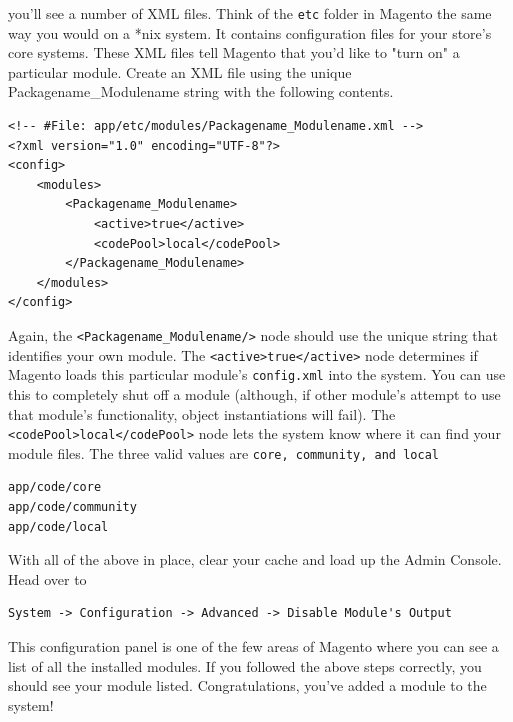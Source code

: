 \documentclass[oneside]{book}
\begin{document}
you'll see a number of XML files.  Think of the \footnotesize\texttt{etc} \normalsize  folder in Magento the same way you would on a *nix system.  It contains configuration files for your store's core systems.  These XML files tell Magento that you'd like to "turn on" a particular module.  Create an XML file using the unique Packagename\_Modulename string with the following contents.

\begin{lstlisting}
<!-- #File: app/etc/modules/Packagename_Modulename.xml -->
<?xml version="1.0" encoding="UTF-8"?>
<config>
    <modules>
        <Packagename_Modulename>
            <active>true</active>
            <codePool>local</codePool>
        </Packagename_Modulename>
    </modules>
</config>

\end{lstlisting}


Again, the \footnotesize\texttt{\textless Packagename\_Modulename/\textgreater } \normalsize  node should use the unique string that identifies your own module.  The \footnotesize\texttt{\textless active\textgreater true\textless /active\textgreater } \normalsize  node determines if Magento loads this particular module's \footnotesize\texttt{config.xml} \normalsize  into the system.  You can use this to completely shut off a module (although, if other module's attempt to use that module's functionality, object instantiations will fail).  The \footnotesize\texttt{\textless codePool\textgreater local\textless /codePool\textgreater } \normalsize  node lets the system know where it can find your module files.  The three valid values are \footnotesize\texttt{core, community, and local} \normalsize

\begin{lstlisting}
app/code/core
app/code/community
app/code/local

\end{lstlisting}


With all of the above in place, clear your cache and load up the Admin Console.  Head over to

\begin{lstlisting}
System -> Configuration -> Advanced -> Disable Module's Output

\end{lstlisting}


This configuration panel is one of the few areas of Magento where you can see a list of all the installed modules.  If you followed the above steps correctly, you should see your module listed.  Congratulations, you've added a module to the system!
\end{document}
